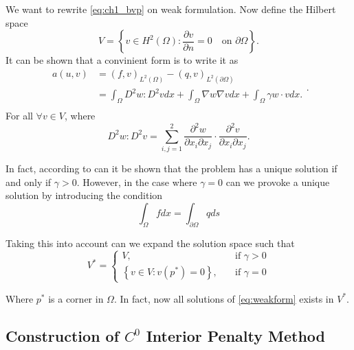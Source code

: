We want to rewrite \eqref{eq:ch1_bvp} on weak formulation. Now define the Hilbert space \[
V = \left\{ v \in H^2\left( \Omega  \right): \frac{\partial v}{\partial  n}  = 0 \quad \text{on } \partial \Omega
\right\}.
\]
It can be shown \cite{gu2012c0} that a convinient form is to write it as
\begin{equation}
\label{eq:weakform}
    \begin{split}
a\left( u,v \right) &=  \left( f,v \right)_{L^2\left( \Omega  \right)}  - \left( q,v \right)_{L^2\left( \partial \Omega  \right)}  \\
& = \int_{\Omega }^{} D^2 w : D^2 v dx +  \int_{\Omega }^{} \nabla w \nabla v dx + \int_{\Omega }^{} \gamma w \cdot v dx
.\\
    \end{split}
.\end{equation}
For all $\forall v \in  V$, where \[
D^2 w : D^2 v = \sum_{i,j=1}^{2}  \frac{\partial ^2 w}{\partial x_{i} \partial x_{j} } \cdot  \frac{\partial ^2 v
}{\partial x_{i} \partial x_{j} }.
\]

In fact, according to \cite{gu2012c0} can it be shown that the problem has a unique solution if and only if $\gamma >
0$. However, in the case where $\gamma  = 0$ can we provoke a unique solution by introducing the condition \[
\int_{\Omega }^{} f dx = \int_{\partial \Omega }^{}  q ds
\]

Taking this into account can we expand the solution space such that \[
V^* = \begin{cases}
    V, \quad & \text{if } \gamma >0 \\
    \left\{ v \in V: v\left( p^* \right) = 0 \right\}, \quad & \text{if } \gamma  =0
\end{cases}
\]

Where $p^{*}$  is a corner in $\Omega $. In fact, now all solutions of \eqref{eq:weakform} exists in $V^{*}$.


\subsection{Construction of $C^{0}$ Interior Penalty Method}%
\label{sub:construction_interior_penalty_method}

